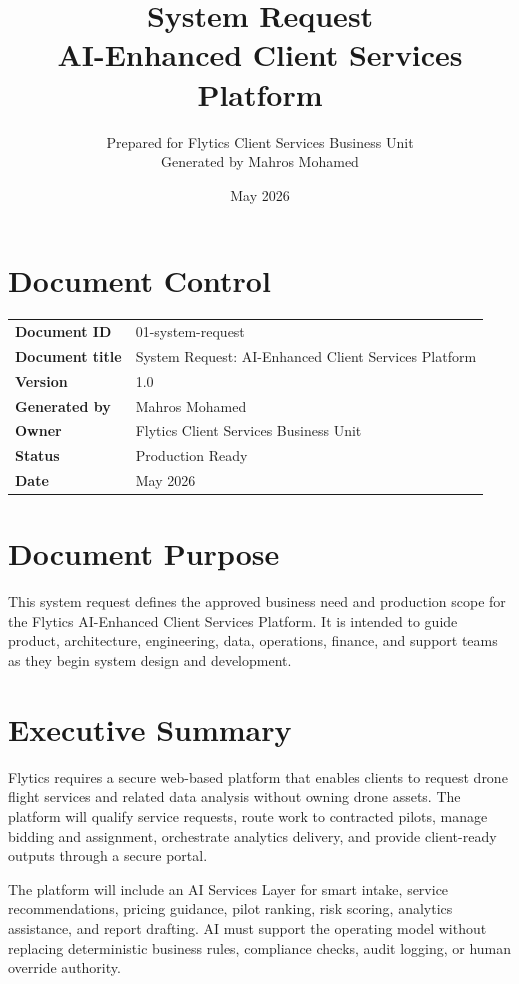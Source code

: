\documentclass[11pt,a4paper]{article}
\title{\textbf{System Request\\AI-Enhanced Client Services Platform}}
\author{Prepared for Flytics Client Services Business Unit\\Generated by Mahros Mohamed}
\date{May 2026}
\begin{document}
\maketitle
\section*{Document Control}
\begin{longtable}{>{\bfseries}p{}p{}}
\toprule
Document ID & 01-system-request \\
Document title & System Request: AI-Enhanced Client Services Platform \\
Version & 1.0 \\
Generated by & Mahros Mohamed \\
Owner & Flytics Client Services Business Unit \\
Status & Production Ready \\
Date & May 2026 \\
\bottomrule
\end{longtable}

\renewcommand{\contentsname}{Contents}
\tableofcontents
\newpage

\section*{Document Purpose}

This system request defines the approved business need and production scope for the Flytics AI-Enhanced Client Services Platform. It is intended to guide product, architecture, engineering, data, operations, finance, and support teams as they begin system design and development.

\section{Executive Summary}

Flytics requires a secure web-based platform that enables clients to request drone flight services and related data analysis without owning drone assets. The platform will qualify service requests, route work to contracted pilots, manage bidding and assignment, orchestrate analytics delivery, and provide client-ready outputs through a secure portal.

The platform will include an AI Services Layer for smart intake, service recommendations, pricing guidance, pilot ranking, risk scoring, analytics assistance, and report drafting. AI must support the operating model without replacing deterministic business rules, compliance checks, audit logging, or human override authority.
\end{document}
